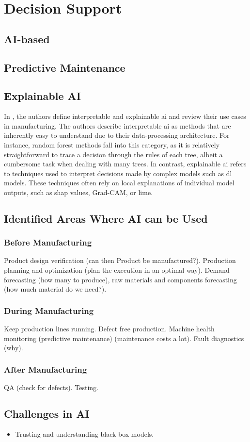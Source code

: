 \section{Decision Support}\label{sec:decision-support}

\subsection{AI-based}

\subsection{Predictive Maintenance}

\subsection{Explainable AI}

In \cite{alexander-an-interrogative-survey-of-explainable-ai-in-manufacturing}, the authors define interpretable and explainable \ac{ai} and review their use cases in manufacturing.
The authors describe interpretable \ac{ai} as methods that are inherently easy to understand due to their data-processing architecture.
For instance, random forest methods fall into this category, as it is relatively straightforward to trace a decision through the rules of each tree, albeit a cumbersome task when dealing with many trees.
In contrast, explainable \ac{ai} refers to techniques used to interpret decisions made by complex models such as \ac{dl} models.
These techniques often rely on local explanations of individual model outputs, such as \ac{shap} values, Grad-CAM, or \ac{lime}.

\subsection{Identified Areas Where AI can be Used}

\subsubsection{Before Manufacturing}
Product design verification (can then Product be manufactured?).
Production planning and optimization (plan the execution in an optimal way).
Demand forecasting (how many to produce), raw materials and components forecasting (how much material do we need?).

\subsubsection{During Manufacturing}
Keep production lines running.
Defect free production.
Machine health monitoring (predictive maintenance) (maintenance costs a lot).
Fault diagnostics (why).

\subsubsection{After Manufacturing}
QA (check for defects).
Testing.

\subsection{Challenges in AI}

\begin{itemize}
  \item Trusting and understanding black box models.
\end{itemize}
